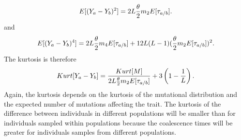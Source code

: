 \begin{equation}
  E[(Y_a-Y_b)^2]=2L\frac{\theta}{2} m_2 E[\tau_{a/b}].
\end{equation}
and
\begin{equation}
  E[(Y_a-Y_b)^4]=2L\frac{\theta}{2} m_4 E[\tau_{a/b}] + 12L(L-1)(\frac{\theta}{2} m_2 E[\tau_{a/b}])^2.
\end{equation}
The kurtosis is therefore
\begin{equation}
  \label{eq:diff_kurt}
  Kurt[Y_a-Y_b]=\frac{Kurt[M]}{2 L\frac{\theta}{2} m_2 E[\tau_{a/b}]} + 3\left(1-\frac{1}{L} \right).
\end{equation}
Again, the kurtosis depends on the kurtosis of the mutational distribution and
the expected number of mutations affecting the trait. The kurtosis of the
difference between individuals in different populations will be smaller than for
individuals sampled within populations because the coalescence times will be
greater for individuals samples from different populations.
